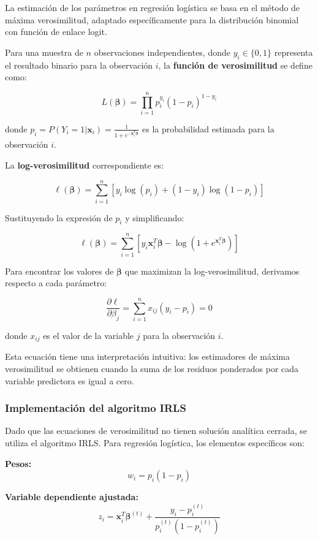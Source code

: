 \documentclass[
  letterpaper,
  DIV=11,
  numbers=noendperiod]{scrreprt}
\begin{document}
La estimación de los parámetros en regresión logística se basa en el
método de máxima verosimilitud, adaptado específicamente para la
distribución binomial con función de enlace logit.

Para una muestra de \(n\) observaciones independientes, donde
\(y_i \in \{0,1\}\) representa el resultado binario para la observación
\(i\), la \textbf{función de verosimilitud} se define como:

\[L(\boldsymbol{\beta}) = \prod_{i=1}^{n} p_i^{y_i}(1-p_i)^{1-y_i}\]

donde
\(p_i = P(Y_i = 1|\mathbf{x}_i) = \frac{1}{1 + e^{-\mathbf{x}_i^T\boldsymbol{\beta}}}\)
es la probabilidad estimada para la observación \(i\).

La \textbf{log-verosimilitud} correspondiente es:

\[\ell(\boldsymbol{\beta}) = \sum_{i=1}^{n} \left[y_i \log(p_i) + (1-y_i) \log(1-p_i)\right]\]

Sustituyendo la expresión de \(p_i\) y simplificando:

\[\ell(\boldsymbol{\beta}) = \sum_{i=1}^{n} \left[y_i \mathbf{x}_i^T\boldsymbol{\beta} - \log(1 + e^{\mathbf{x}_i^T\boldsymbol{\beta}})\right]\]

Para encontrar los valores de \(\boldsymbol{\beta}\) que maximizan la
log-verosimilitud, derivamos respecto a cada parámetro:

\[\frac{\partial \ell}{\partial \beta_j} = \sum_{i=1}^{n} x_{ij}(y_i - p_i) = 0\]

donde \(x_{ij}\) es el valor de la variable \(j\) para la observación
\(i\).

Esta ecuación tiene una interpretación intuitiva: los estimadores de
máxima verosimilitud se obtienen cuando la suma de los residuos
ponderados por cada variable predictora es igual a cero.

\subsubsection{Implementación del algoritmo
IRLS}\label{implementaciuxf3n-del-algoritmo-irls}

Dado que las ecuaciones de verosimilitud no tienen solución analítica
cerrada, se utiliza el algoritmo IRLS. Para regresión logística, los
elementos específicos son:

\textbf{Pesos:} \[w_i = p_i(1-p_i)\]

\textbf{Variable dependiente ajustada:}
\[z_i = \mathbf{x}_i^T\boldsymbol{\beta}^{(t)} + \frac{y_i - p_i^{(t)}}{p_i^{(t)}(1-p_i^{(t)})}\]
\end{document}
